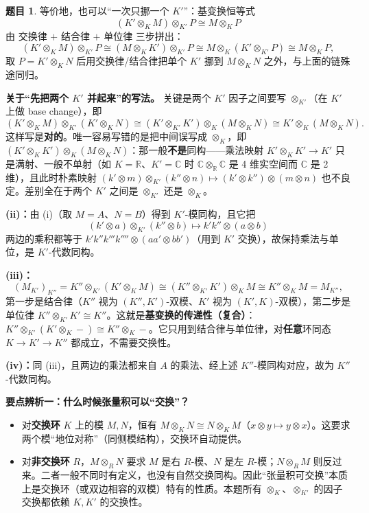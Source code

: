 \documentclass[a4paper]{ctexart}
\theoremstyle{definition}
\newtheorem{example}{题目}[section]
\theoremstyle{analysis}
\theoremstyle{plain}
\begin{document}
\begin{example}
等价地，也可以``一次只挪一个 \(K'\)''：基变换恒等式
\[
  (K'\otimes_K M)\otimes_{K'}P\cong M\otimes_K P
\]
由 交换律 \(+\) 结合律 \(+\) 单位律 三步拼出：
\[
  (K'\otimes_K M)\otimes_{K'}P
  \cong(M\otimes_K K')\otimes_{K'}P
  \cong M\otimes_K(K'\otimes_{K'}P)
  \cong M\otimes_K P,
\]
取 \(P=K'\otimes_KN\) 后用交换律/结合律把单个 \(K'\) 挪到 \(M\otimes_KN\) 之外，与上面的链殊途同归。

\textbf{关于``先把两个 \(K'\) 并起来''的写法。} 关键是两个 \(K'\) 因子之间要写 \(\otimes_{K'}\)（在 \(K'\) 上做 base change），即
\[
  (K'\otimes_K M)\otimes_{K'}(K'\otimes_K N)
  \cong (K'\otimes_{K'}K')\otimes_K(M\otimes_K N)
  \cong K'\otimes_K(M\otimes_K N).
\]
这样写是\textbf{对的}。唯一容易写错的是把中间误写成 \(\otimes_K\)，即 \((K'\otimes_KK')\otimes_K(M\otimes_KN)\)：那一般\textbf{不是}同构——乘法映射 \(K'\otimes_KK'\to K'\) 只是满射、一般不单射（如 \(K=\mathbb R\)、\(K'=\mathbb C\) 时 \(\mathbb C\otimes_{\mathbb R}\mathbb C\) 是 4 维实空间而 \(\mathbb C\) 是 2 维），且此时朴素映射 \((k'\otimes m)\otimes_{K'}(k''\otimes n)\mapsto(k'\otimes k'')\otimes(m\otimes n)\) 也不良定。差别全在于两个 \(K'\) 之间是 \(\otimes_{K'}\) 还是 \(\otimes_K\)。

\textbf{(ii)：}由 (i)（取 \(M=A\)、\(N=B\)）得到 \(K'\)-模同构，且它把
\[
  (k'\otimes a)\otimes_{K'}(k''\otimes b)\longmapsto k'k''\otimes(a\otimes b)
\]
两边的乘积都等于 \(k'k''k'''k''''\otimes(aa'\otimes bb')\)（用到 \(K'\) 交换），故保持乘法与单位，是 \(K'\)-代数同构。

\textbf{(iii)：}
\[
  (M_{K'})_{K''}
  =K''\otimes_{K'}(K'\otimes_K M)
  \cong(K''\otimes_{K'}K')\otimes_K M
  \cong K''\otimes_K M
  =M_{K''},
\]
第一步是结合律（\(K''\) 视为 \((K'',K')\)-双模、\(K'\) 视为 \((K',K)\)-双模），第二步是单位律 \(K''\otimes_{K'}K'\cong K''\)。这就是\textbf{基变换的传递性（复合）}：\(K''\otimes_{K'}(K'\otimes_K-)\cong K''\otimes_K-\)。它只用到结合律与单位律，对\textbf{任意}环同态 \(K\to K'\to K''\) 都成立，不需要交换性。

\textbf{(iv)：}同 (iii)，且两边的乘法都来自 \(A\) 的乘法、经上述 \(K''\)-模同构对应，故为 \(K''\)-代数同构。

\textbf{要点辨析一：什么时候张量积可以``交换''？}
\begin{itemize}
  \item 对\textbf{交换环} \(K\) 上的模 \(M,N\)，恒有 \(M\otimes_KN\cong N\otimes_KM\)（\(x\otimes y\mapsto y\otimes x\)）。这要求两个模``地位对称''（同侧模结构），交换环自动提供。
  \item 对\textbf{非交换环} \(R\)，\(M\otimes_RN\) 要求 \(M\) 是右 \(R\)-模、\(N\) 是左 \(R\)-模；\(N\otimes_RM\) 则反过来。二者一般不同时有定义，也没有自然交换同构。因此``张量积可交换''本质上是交换环（或双边相容的双模）特有的性质。本题所有 \(\otimes_K\)、\(\otimes_{K'}\) 的因子交换都依赖 \(K,K'\) 的交换性。
\end{itemize}


\end{example}
\end{document}
